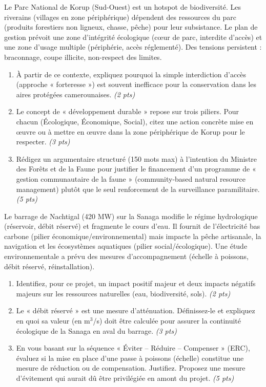 \documentclass[11pt]{article}
\begin{document}
\begin{exercice}
\label{exo:korup}
Le Parc National de Korup (Sud-Ouest) est un hotspot de biodiversité. Les riverains (villages en zone périphérique) dépendent des ressources du parc (produits forestiers non ligneux, chasse, pêche) pour leur subsistance. Le plan de gestion prévoit une zone d'intégrité écologique (cœur de parc, interdite d'accès) et une zone d'usage multiple (périphérie, accès réglementé). Des tensions persistent : braconnage, coupe illicite, non-respect des limites.

\begin{enumerate}
    \item À partir de ce contexte, expliquez pourquoi la simple interdiction d'accès (approche « forteresse ») est souvent inefficace pour la conservation dans les aires protégées camerounaises. \textit{(2 pts)}
    \item Le concept de « développement durable » repose sur trois piliers. Pour chacun (Écologique, Économique, Social), citez une action concrète mise en œuvre ou à mettre en œuvre dans la zone périphérique de Korup pour le respecter. \textit{(3 pts)}
    \item Rédigez un argumentaire structuré (150 mots max) à l'intention du Ministre des Forêts et de la Faune pour justifier le financement d'un programme de « gestion communautaire de la faune » (community-based natural resource management) plutôt que le seul renforcement de la surveillance paramilitaire. \textit{(5 pts)}
\end{enumerate}
\end{exercice}

\begin{exercice}
\label{exo:nachtigal}
Le barrage de Nachtigal (420 MW) sur la Sanaga modifie le régime hydrologique (réservoir, débit réservé) et fragmente le cours d'eau. Il fournit de l'électricité bas carbone (pilier économique/environnemental) mais impacte la pêche artisanale, la navigation et les écosystèmes aquatiques (pilier social/écologique). Une étude environnementale a prévu des mesures d'accompagnement (échelle à poissons, débit réservé, réinstallation).

\begin{enumerate}
    \item Identifiez, pour ce projet, un impact positif majeur et deux impacts négatifs majeurs sur les ressources naturelles (eau, biodiversité, sols). \textit{(2 pts)}
    \item Le « débit réservé » est une mesure d'atténuation. Définissez-le et expliquez en quoi sa valeur (en m$^3$/s) doit être calculée pour assurer la continuité écologique de la Sanaga en aval du barrage. \textit{(3 pts)}
    \item En vous basant sur la séquence « Éviter – Réduire – Compenser » (ERC), évaluez si la mise en place d'une passe à poissons (échelle) constitue une mesure de réduction ou de compensation. Justifiez. Proposez une mesure d'évitement qui aurait dû être privilégiée en amont du projet. \textit{(5 pts)}
\end{enumerate}
\end{exercice}
\end{document}
